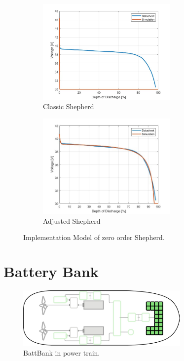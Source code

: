 \begin{figure}[h]

\begin{subfigure}{0.5\textwidth}
    \centering
    \includegraphics[width=0.75\textwidth]{images/chapter05/01_BattCell/BattCellSim1.jpg} 
    \caption{Classic Shepherd}
    \label{fig:subim1}
\end{subfigure}
\begin{subfigure}{0.5\textwidth}
    \centering
    \includegraphics[width=0.75\textwidth]{images/chapter05/01_BattCell/BattCellSim2.jpg} 
    \caption{Adjusted Shepherd}
    \label{fig:subim2}
\end{subfigure}

\caption{Implementation Model of zero order Shepherd.}
\label{fig:image2}
\end{figure}


\section{Battery Bank}

\begin{figure}[h!]
    \centering
    \includegraphics[width=0.75\textwidth]{images/chapter05/BattBank_scheme.jpg}
    \caption{BattBank in power train.}
    \label{BattBank}
\end{figure}

